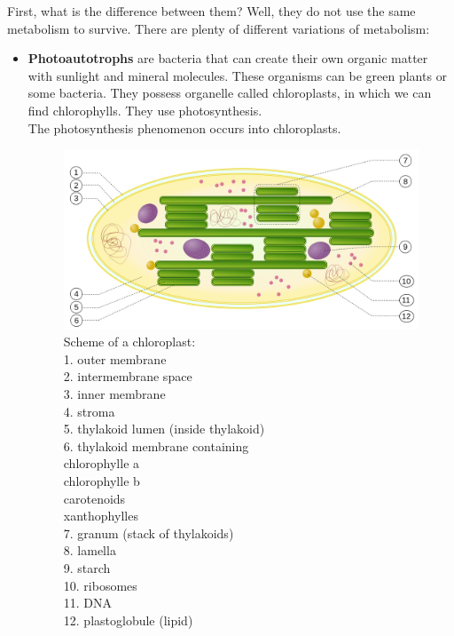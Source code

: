 \documentclass[draft, final]{report}
\begin{document}
First, what is the difference between them? Well, they do not use the same metabolism to survive. There are plenty of different variations of metabolism:\\
\par
\begin{itemize}
  \item \textbf{Photoautotrophs} are bacteria that can create their own organic matter with sunlight and mineral molecules. These organisms can be green plants or some bacteria. They possess organelle called chloroplasts, in which we can find chlorophylls. They use photosynthesis.\\
	The photosynthesis phenomenon occurs into chloroplasts. \\
  \begin{figure}[!ht]
    \centering
    \includegraphics[scale=0.3]{LateX/Images/Chloroplast.png}
    \caption{Scheme of a chloroplast:
              \\ 1. outer membrane
              \\ 2. intermembrane space
              \\ 3. inner membrane
              \\ 4. stroma
              \\ 5. thylakoid lumen (inside thylakoid)
              \\ 6. thylakoid membrane containing
	                \\ chlorophylle a
	                \\ chlorophylle b
		              \\ carotenoids
		              \\ xanthophylles
              \\ 7. granum (stack of thylakoids)
              \\ 8. lamella
              \\ 9. starch
              \\ 10. ribosomes
              \\ 11. DNA
              \\ 12. plastoglobule (lipid)\cite{chloroplast}}
  \end{figure}


\end{itemize}
\end{document}
